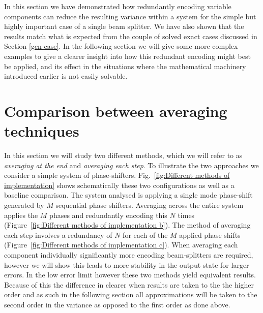 \documentclass[aps,pra,twocolumn,superscriptaddress,numerical,floatfix]{revtex4-1}
\begin{document}
In this section we have demonstrated how redundantly encoding variable components can reduce the resulting variance within a system for the simple but highly important case of a single beam splitter. We have also shown that the results match what is expected from the couple of solved exact cases discussed in Section \ref{gen case}. In the following section we will give some more complex examples to give a clearer insight into how this redundant encoding might best be applied, and its effect in the situations where the mathematical machinery introduced earlier is not easily solvable.

\section{Comparison between averaging techniques \label{averaging at end vs step}}

In this section we will study two different methods, which we will refer to as \textit{averaging at the end} and \textit{averaging each step}. To illustrate the two approaches we consider a simple system of phase-shifters. Fig.~\ref{fig:Different methods of implementation} shows schematically these two configurations as well as a baseline comparison. The system analysed is applying a single mode phase-shift generated by $M$ sequential phase shifters.  Averaging across the entire system applies the $M$ phases and redundantly encoding this $N$ times (Figure~\ref{fig:Different methods of implementation b}). The method of averaging each step involves a redundancy of $N$ for each of the $M$ applied phase shifts (Figure~\ref{fig:Different methods of implementation c}).  When averaging each component individually significantly more encoding beam-splitters are required, however we will show this leads to more stability in the output state for larger errors. In the low error limit however these two methods yield equivalent results. Because of this the difference in clearer when results are taken to the the higher order and as such in the following section all approximations will be taken to the second order in the variance as opposed to the first order as done above.
\end{document}
